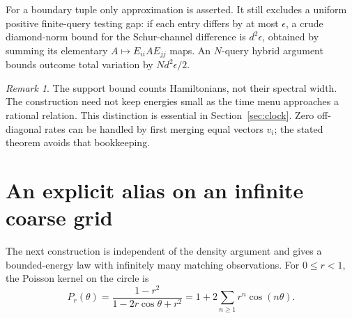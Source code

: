 \documentclass[11pt,a4paper]{article}
\theoremstyle{remark}\newtheorem{remark}[theorem]{Remark}
\begin{document}
For a boundary tuple only approximation is asserted. It still excludes
a uniform positive finite-query testing gap: if each entry differs by
at most $\epsilon$, a crude diamond-norm bound for the Schur-channel
difference is $d^2\epsilon$, obtained by summing its elementary
$A\mapsto E_{ii}AE_{jj}$ maps. An $N$-query hybrid argument bounds
outcome total variation by $Nd^2\epsilon/2$.

\begin{remark}
The support bound counts Hamiltonians, not their spectral width.
The construction need not keep energies small as the time menu approaches
a rational relation. This distinction is essential in
Section~\ref{sec:clock}. Zero off-diagonal rates can be handled by first
merging equal vectors $v_i$; the stated theorem avoids that bookkeeping.
\end{remark}

\section{An explicit alias on an infinite coarse grid}\label{sec:grid}
The next construction is independent of the density argument and gives
a bounded-energy law with infinitely many matching observations.
For $0\leq r<1$, the Poisson kernel on the circle is
\begin{equation}\label{eq:poisson}
 P_r(\theta)=\frac{1-r^2}{1-2r\cos\theta+r^2}
 =1+2\sum_{n\geq1}r^n\cos(n\theta).
\end{equation}
\end{document}
